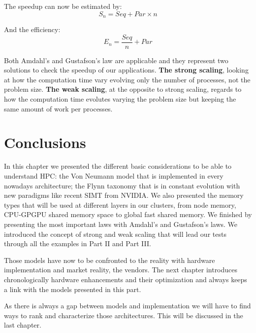 The speedup can now be estimated by:
\begin{equation}
S_n = Seq + Par \times n
\end{equation}

And the efficiency: 
\begin{equation}
E_n = \frac{Seq}{n} + Par
\end{equation}


Both Amdahl's and Gustafson's law are applicable and they represent two solutions to check the speedup of our applications. 
\textbf{The strong scaling}, looking at how the computation time vary evolving only the number of processes, not the problem size. 
\textbf{The weak scaling}, at the opposite to strong scaling, regards to how the computation time evolutes varying the problem size but keeping the same amount of work per processes. 

\section{Conclusions}

In this chapter we presented the different basic considerations to be able to understand HPC: the Von Neumann model that is implemented in every nowadays architecture; the Flynn taxonomy that is in constant evolution with new paradigms like recent SIMT from NVIDIA. 
We also presented the memory types that will be used at different layers in our clusters, from node memory, CPU-GPGPU shared memory space to global fast shared memory. 
We finished by presenting the most important laws with Amdahl's and Gustafson's laws.
We introduced the concept of strong and weak scaling that will lead our tests through all the examples in Part II and Part III.

Those models have now to be confronted to the reality with hardware implementation and market reality, the vendors. 
The next chapter introduces chronologically hardware enhancements and their optimization and always keeps a link with the models presented in this part.

As there is always a gap between models and implementation we will have to find ways to rank and characterize those architectures. 
This will be discussed in the last chapter. 
